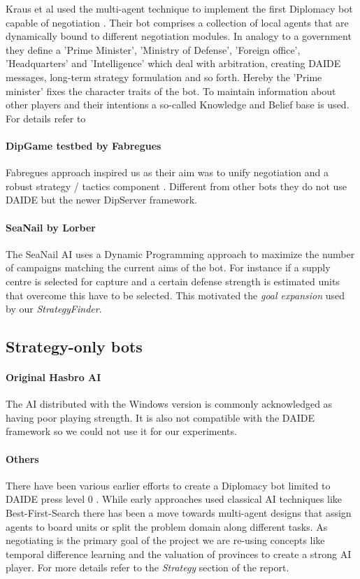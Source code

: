 \documentclass[pdftex,11pt,a4paper]{report}
\begin{document}
Kraus et al used the multi-agent technique to implement the first
Diplomacy bot capable of negotiation \cite{Kraus95}. Their bot
comprises a collection of local agents that are dynamically bound to
different negotiation modules. In analogy to a government they define
a 'Prime Minister', 'Ministry of Defense', 'Foreign office',
'Headquarters' and 'Intelligence' which deal with arbitration,
creating DAIDE messages, long-term strategy formulation and so
forth. Hereby the 'Prime minister' fixes the character traits of the
bot. To maintain information about other players and their intentions
a so-called Knowledge and Belief base is used. For details refer to
\cite{Kraus88}

\paragraph{DipGame testbed by Fabregues}

Fabregues approach inspired us as their aim was to unify negotiation
and a robust strategy / tactics component \cite{Fabregues11}. Different
from other bots they do not use DAIDE but the newer DipServer framework. 

\paragraph{SeaNail by Lorber}

The SeaNail AI \cite{Lorber98} uses a Dynamic Programming approach to
maximize the number of campaigns matching the current aims of the
bot. For instance if a supply centre is selected for capture and a
certain defense strength is estimated units that overcome this have to
be selected. This motivated the \textit{goal expansion} used by 
our \textit{StrategyFinder}.

\subsection{Strategy-only bots}

\paragraph{Original Hasbro AI}
The AI distributed with the Windows version is commonly 
acknowledged as having poor playing strength. It is also not
compatible with the DAIDE framework so we could not use it for
our experiments.

\paragraph{Others}
There have been various earlier efforts to create a Diplomacy bot
limited to DAIDE press level 0 \cite{DAIDEsyntax10}. While early
approaches used classical AI techniques like Best-First-Search there
has been a move towards multi-agent designs that assign agents to
board units or split the problem domain along different tasks. As
negotiating is the primary goal of the project we are re-using
concepts like temporal difference learning \cite{Levinson94} and the
valuation of provinces \cite{Huff05} to create a strong AI player. For 
more details refer to the \textit{Strategy} section of the report.
\end{document}

